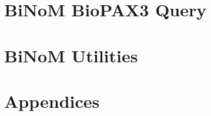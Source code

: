 \documentclass[11pt]{article}
\begin{document}
\section{BiNoM BioPAX3 Query}

\clearpage

\section{BiNoM Utilities}

\clearpage

\section{Appendices}


\clearpage


\end{document}
